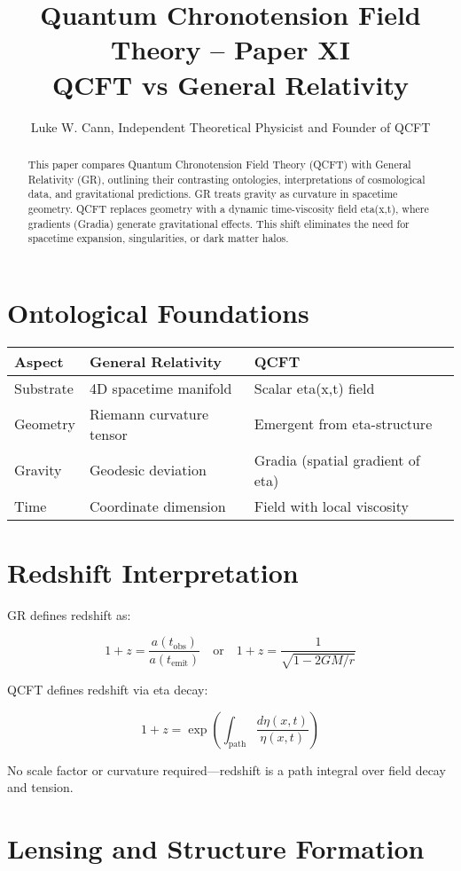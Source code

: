 \documentclass[12pt]{article}
\title{Quantum Chronotension Field Theory – Paper XI\\QCFT vs General Relativity}
\author{Luke W. Cann, Independent Theoretical Physicist and Founder of QCFT}
\date{}
\begin{document}
\maketitle

\begin{abstract}
This paper compares Quantum Chronotension Field Theory (QCFT) with General Relativity (GR), outlining their contrasting ontologies, interpretations of cosmological data, and gravitational predictions. GR treats gravity as curvature in spacetime geometry. QCFT replaces geometry with a dynamic time-viscosity field eta(x,t), where gradients (Gradia) generate gravitational effects. This shift eliminates the need for spacetime expansion, singularities, or dark matter halos.
\end{abstract}

\section{Ontological Foundations}

\begin{tabular}{@{}llll@{}}
\toprule
Aspect & General Relativity & QCFT \\
\midrule
Substrate & 4D spacetime manifold & Scalar eta(x,t) field \\
Geometry & Riemann curvature tensor & Emergent from eta-structure \\
Gravity & Geodesic deviation & Gradia (spatial gradient of eta) \\
Time & Coordinate dimension & Field with local viscosity \\
\bottomrule
\end{tabular}

\section{Redshift Interpretation}

GR defines redshift as:

\[
1 + z = \frac{a(t_{\text{obs}})}{a(t_{\text{emit}})} \quad \text{or} \quad 1 + z = \frac{1}{\sqrt{1 - 2GM/r}}
\]

QCFT defines redshift via eta decay:

\[
1 + z = \exp\left( \int_{\text{path}} \frac{d\eta(x,t)}{\eta(x,t)} \right)
\]

No scale factor or curvature required—redshift is a path integral over field decay and tension.

\section{Lensing and Structure Formation}
\end{document}
